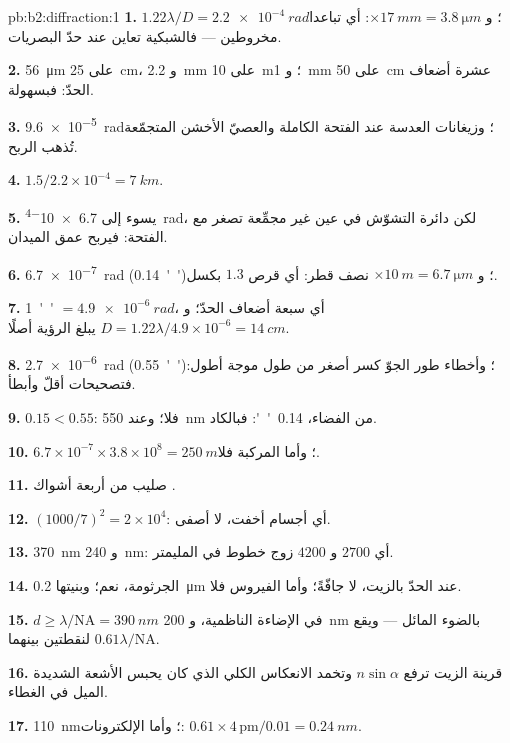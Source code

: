 \begin{solution}{pb:b2:diffraction:1}
\textbf{1.} $1.22\lambda/D = \qty{2.2e-4}{rad}$؛ و $\times\qty{17}{mm} = \qty{3.8}{\micro m}$: أي تباعدا
مخروطين --- فالشبكية تعاين عند حدّ البصريات.

\textbf{2.} \qty{56}{\micro m} على \qty{25}{cm}، و \qty{2.2}{mm} على \qty{10}{m}؛ و \qty{1}{mm} على
\qty{50}{cm} عشرة أضعاف الحدّ: فبسهولة.

\textbf{3.} \qty{9.6e-5}{rad}؛ وزيغانات العدسة عند الفتحة الكاملة والعصيّ
الأخشن المتجمّعة تُذهب الربح.

\textbf{4.} $1.5/2.2 \times 10^{-4} = \qty{7}{km}$.

\textbf{5.} يسوء  إلى \qty{6.7e-4}{rad}، لكن دائرة التشوّش في
عين غير مجمِّعة تصغر مع الفتحة: فيربح عمق الميدان.

\textbf{6.} \qty{6.7e-7}{rad} (\qty{0.14}{''})؛ و $\times\qty{10}{m} = \qty{6.7}{\micro m}$ نصف قطر: أي
قرص $1.3$ بكسل.

\textbf{7.} \qty{1}{''} $= \qty{4.9e-6}{rad}$، أي سبعة أضعاف الحدّ؛ و $D = 1.22\lambda/4.9
\times 10^{-6} = \qty{14}{cm}$ يبلغ الرؤية أصلًا.

\textbf{8.} \qty{2.7e-6}{rad} (\qty{0.55}{''})؛ وأخطاء طور الجوّ
كسر أصغر من طول موجة أطول: فتصحيحات أقلّ وأبطأ.

\textbf{9.} $0.15 < 0.55$: فلا؛ وعند \qty{550}{nm} من الفضاء، \qty{0.14}{''}: فبالكاد.

\textbf{10.} $6.7 \times 10^{-7} \times 3.8 \times 10^8 = \qty{250}{m}$؛ وأما المركبة فلا.

\textbf{11.} صليب من أربعة أشواك .

\textbf{12.} $(1000/7)^2 = 2 \times 10^4$: أي أجسام أخفت، لا أصفى.

\textbf{13.} \qty{370}{nm} و \qty{240}{nm}: أي $2700$ و $4200$ زوج خطوط في
المليمتر.

\textbf{14.} الجرثومة، نعم؛ وبنيتها \qty{0.2}{\micro m} عند الحدّ
بالزيت، لا جافّةً؛ وأما الفيروس فلا.

\textbf{15.} $d \ge \lambda/\mathrm{NA} = \qty{390}{nm}$ في الإضاءة الناظمية، و \qty{200}{nm}
بالضوء المائل --- ويقع $0.61\lambda/\mathrm{NA}$ لنقطتين بينهما.

\textbf{16.} قرينة الزيت ترفع $n\sin\alpha$ وتخمد الانعكاس
الكلي الذي كان يحبس الأشعة الشديدة الميل في الغطاء.

\textbf{17.} \qty{110}{nm}؛ وأما الإلكترونات: $0.61 \times 4\,\text{pm}/0.01 = \qty{0.24}{nm}$.


\end{solution}
